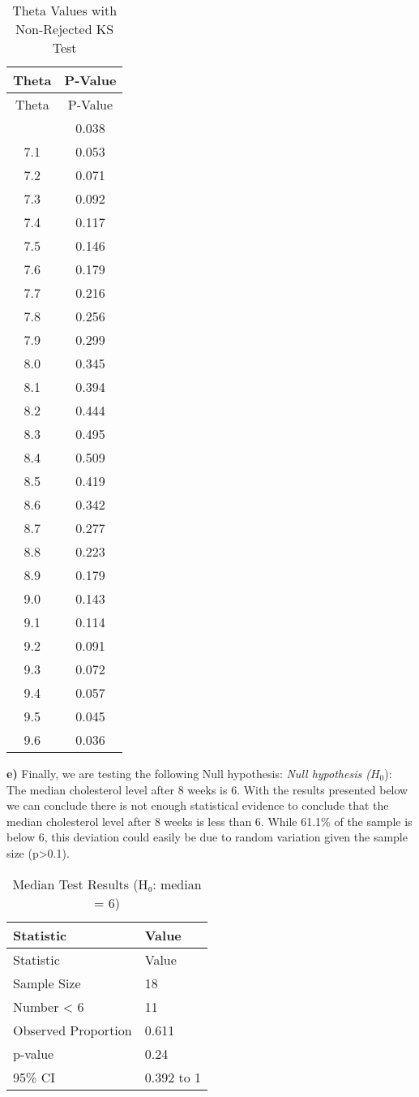 \documentclass[
]{article}
\begin{document}
\begin{longtable}[]{@{}cc@{}}
\caption{Theta Values with Non-Rejected KS Test}\tabularnewline
\toprule\noalign{}
Theta & P-Value \\
\midrule\noalign{}
\endfirsthead
\toprule\noalign{}
Theta & P-Value \\
\midrule\noalign{}
\endhead
\bottomrule\noalign{}
\endlastfoot
7.0 & 0.038 \\
7.1 & 0.053 \\
7.2 & 0.071 \\
7.3 & 0.092 \\
7.4 & 0.117 \\
7.5 & 0.146 \\
7.6 & 0.179 \\
7.7 & 0.216 \\
7.8 & 0.256 \\
7.9 & 0.299 \\
8.0 & 0.345 \\
8.1 & 0.394 \\
8.2 & 0.444 \\
8.3 & 0.495 \\
8.4 & 0.509 \\
8.5 & 0.419 \\
8.6 & 0.342 \\
8.7 & 0.277 \\
8.8 & 0.223 \\
8.9 & 0.179 \\
9.0 & 0.143 \\
9.1 & 0.114 \\
9.2 & 0.091 \\
9.3 & 0.072 \\
9.4 & 0.057 \\
9.5 & 0.045 \\
9.6 & 0.036 \\
\end{longtable}

\textbf{e)} Finally, we are testing the following Null hypothesis:
\emph{Null hypothesis (}\(H_0\)): The median cholesterol level after 8
weeks is 6. With the results presented below we can conclude there is
not enough statistical evidence to conclude that the median cholesterol
level after 8 weeks is less than 6. While 61.1\% of the sample is below
6, this deviation could easily be due to random variation given the
sample size (p\textgreater0.1).

\begin{longtable}[]{@{}ll@{}}
\caption{Median Test Results (H₀: median = 6)}\tabularnewline
\toprule\noalign{}
Statistic & Value \\
\midrule\noalign{}
\endfirsthead
\toprule\noalign{}
Statistic & Value \\
\midrule\noalign{}
\endhead
\bottomrule\noalign{}
\endlastfoot
Sample Size & 18 \\
Number \textless{} 6 & 11 \\
Observed Proportion & 0.611 \\
p-value & 0.24 \\
95\% CI & 0.392 to 1 \\
\end{longtable}
\end{document}
